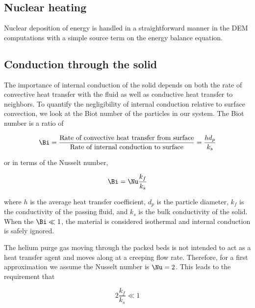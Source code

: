 \subsection{Nuclear heating}

Nuclear deposition of energy is handled in a straightforward manner in the DEM computations with a simple source term on the energy balance equation. 












\subsection{Conduction through the solid}\label{sec:ht-pebble-conduction}

The importance of internal conduction of the solid depends on both the rate of convective heat transfer with the fluid as well as conductive heat transfer to neighbors. To quantify the negligibility of internal conduction relative to surface convection, we look at the Biot number of the particles in our system. The Biot number is a ratio of

\begin{equation}
	\Bi = \frac{\text{Rate of convective heat transfer from surface}}{\text{Rate of internal conduction to surface}} = \frac{hd_p}{k_s}
\end{equation}

or in terms of the Nusselt number,

\begin{equation}
	\Bi = \Nu \frac{k_f}{k_s}
\end{equation}

where $h$ is the average heat transfer coefficient, $d_p$ is the particle diameter, $k_f$ is the conductivity of the passing fluid, and $k_s$ is the bulk conductivity of the solid. When the $\Bi \ll 1$, the material is considered isothermal and internal conduction is safely ignored. 

The helium purge gas moving through the packed beds is not intended to act as a heat transfer agent and moves along at a creeping flow rate. Therefore, for a first approximation we assume the Nusselt number is $\Nu = 2$. This leads to the requirement that

\begin{equation}
	2 \frac{k_f}{k_s} \ll 1
\end{equation}

